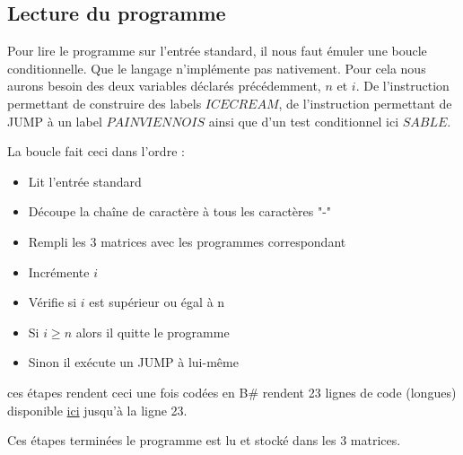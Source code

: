\documentclass[11pt,colorlinks=true,a4paper]{article}
\newcommand{\bs}{B\# }
\begin{document}
    \subsection{Lecture du programme}
    Pour lire le programme sur l'entrée standard, il nous faut émuler une boucle conditionnelle. Que le langage n'implémente pas nativement. 
    Pour cela nous aurons besoin des deux variables déclarés précédemment, $n$ et $i$. De l'instruction permettant de construire des labels $ICECREAM$,
    de l'instruction permettant de JUMP à un label $PAINVIENNOIS$ ainsi que d'un test conditionnel ici $SABLE$.\par 
    \bigskip 

    La boucle fait ceci dans l'ordre : 
    \begin{itemize}
        \item Lit l'entrée standard 
        \item Découpe la chaîne de caractère à tous les caractères "-" 
        \item Rempli les 3 matrices avec les programmes correspondant
        \item Incrémente $i$
        \item Vérifie si $i$ est supérieur ou égal à n
        \item Si $i\geq n$ alors il quitte le programme 
        \item Sinon il exécute un JUMP à lui-même
    \end{itemize}
    ces étapes rendent ceci une fois codées en \bs rendent 23 lignes de code (longues) disponible \href{https://github.com/coco33920/ocaml-baguettesharp-interpreter/blob/master/examples/turing.baguette#L3}{ici} 
    jusqu'à la ligne 23.\par 
    \bigskip 
    Ces étapes terminées le programme est lu et stocké dans les 3 matrices.
\end{document}
